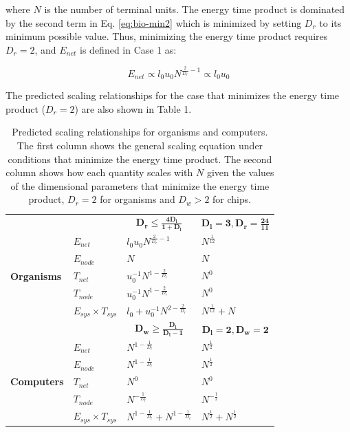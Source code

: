 \documentclass[12pt]{article}
\newcommand\T{\rule{0pt}{3ex}}       %
\newcommand\B{\rule[-1.2ex]{0pt}{0pt}} %
\begin{document}
\noindent where $N$ is the number of terminal units.  The energy time product is dominated by the second term in Eq.
\ref{eq:bio-min2} which is minimized by setting $D_r$ to its minimum possible
value. Thus, minimizing the energy time product requires $D_r = 2$, and 
 $E_{net}$ is defined in Case 1 as: 

\begin{equation}
E_{net} \propto l_0 u_0 N^{\frac{2}{D_r}-1} \propto l_0 u_0
\label{eq:EnetOrg}
\end{equation}


\noindent The predicted scaling relationships for the case that minimizes the energy time product ($D_r = 2$) are also shown in Table 1.



\begin{table}
\centering
\begin{tabular}{l|l||l|l|}
\multicolumn{2}{l}{} & \multicolumn{1}{c}{$\mathbf{D_r \leq
\frac{4D_l}{1+D_l}}$} & \multicolumn{1}{c}{$\mathbf{D_l=3, D_r=\frac{24}{11}}$}
  \T \B \\
  \cline{2-4}
\multirow{5}{*}{\textbf{Organisms}} & $E_{net}$ &$l_0u_0 N^{\frac{2}{D_r}-1}$ &
  $N^{\frac{1}{12}}$ \T \\
\cline{2-4}
& $E_{node}$ &  $N$ & $N$ \T \\
\cline{2-4}
& $T_{net}$ & $u_0^{-1}N^{1-\frac{2}{D_r}}$ & $N^0$ \T \\
\cline{2-4}
& $T_{node}$ & $u_0^{-1}N^{1-\frac{2}{D_r}}$ & $N^0$ \T \\  

\cline{2-4}
& $E_{sys} \times T_{sys}$ & $l_0 + u_0^{-1}N^{2-\frac{2}{D_r}}$ &
$N^{\frac{1}{12}} + N$ \T \\
\cline{2-4}
\multicolumn{2}{c}{}  & \multicolumn{1}{c}{$\mathbf{D_w \geq
\frac{D_l}{D_l-1}}$} & \multicolumn{1}{c}{$\mathbf{D_l=2,D_w =2}$} \T \B \\
\cline{2-4}
\multirow{5}{*}{\textbf{Computers}} & $E_{net}$ & $N^{1-\frac{1}{D_l}}$&
$N^{\frac{1}{2}}$ \T \\
\cline{2-4}
& $E_{node}$&$N^{1-\frac{1}{D_l}}$ &$N^{\frac{1}{2}}$ \T \\
\cline{2-4}
& $T_{net}$ & $N^{0}$& $N^{0}$ \T \\
\cline{2-4}
& $T_{node}$& $N^{-\frac{1}{D_l}}$& $N^{-\frac{1}{2}}$ \T \\
\cline{2-4}
& $E_{sys} \times T_{sys}$ &$N^{1-\frac{1}{D_l}} + N^{1-\frac{1}{D_l}}$
&$N^{\frac{1}{2}} + N^{\frac{1}{2}}$ \T \\
\cline{2-4}
\end{tabular}
\caption{Predicted scaling relationships for organisms and computers. The first column shows the general scaling equation under conditions that minimize the energy time product. The second column shows how each quantity scales with $N$ given the values of the dimensional parameters that minimize the energy time product, $D_r = 2$ for organisms and $D_w > 2$ for chips. 
\label{tab:SummaryScalingPredictions}}
\end{table}
\end{document}
